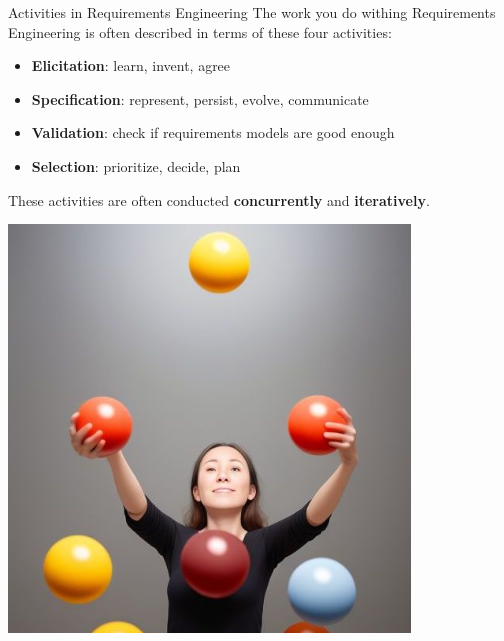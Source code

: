 \documentclass{simpleslides}
\begin{document}
\begin{frame}[fragile]{Activities in Requirements Engineering}
The work you do withing Requirements Engineering is often described in terms of these four activities:
\begin{itemize}
\item \textbf{Elicitation}: learn, invent, agree
\item \textbf{Specification}: represent, persist, evolve, communicate
\item \textbf{Validation}: check if requirements models are good enough
\item \textbf{Selection}: prioritize, decide, plan
\end{itemize}
\vspace*{1em}
\begin{minipage}[t]{0.6\textwidth}
\vspace{0pt}
These activities are often conducted \textbf{concurrently} and \textbf{iteratively}.
\end{minipage}%
\begin{minipage}[t]{0.4\textwidth}
\vspace{0pt}
\hfill\includegraphics[width=0.8\textwidth]{img/juggling-cropped}
\end{minipage}%

\end{frame}
\end{document}
